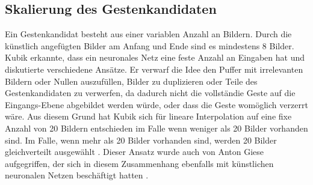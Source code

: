 \subsection{Skalierung des Gestenkandidaten}
Ein Gestenkandidat besteht aus einer variablen Anzahl an Bildern. Durch die künstlich angefügten Bilder am Anfang und Ende sind es mindestens 8 Bilder. Kubik erkannte, dass ein neuronales Netz eine feste Anzahl an
Eingaben hat und diskutierte verschiedene Ansätze. Er verwarf die Idee den Puffer mit irrelevanten Bildern oder Nullen auszufüllen, Bilder zu duplizieren oder Teile des Gestenkandidaten zu verwerfen, da dadurch
nicht die vollständie Geste auf die Eingangs-Ebene abgebildet werden würde, oder dass die Geste womöglich verzerrt wäre. Aus diesem Grund hat Kubik sich für lineare Interpolation auf eine fixe Anzahl von 20 Bildern
entschieden im Falle wenn weniger als 20 Bilder vorhanden sind. Im Falle, wenn mehr als 20 Bilder vorhanden sind, werden 20 Bilder gleichverteilt ausgewählt \cite{kubikThesis}.
Dieser Ansatz wurde auch von Anton Giese aufgegriffen, der sich in diesem Zusammenhang ebenfalls mit künstlichen neuronalen Netzen beschäftigt hatten \cite{gieseThesis}.